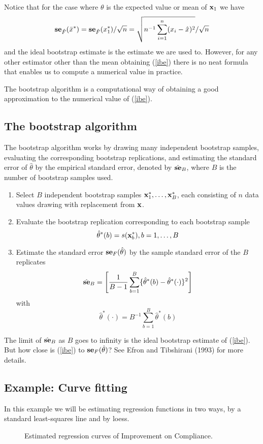 Notice that for the case where $\theta$ is the
expected value or mean of ${\mathbf x}_1$ we have
\[
{\bf se}_{\hat{F}}(\bar{x}^*) = {\bf se}_{\hat{F}}(x^*_1)/\sqrt{n} =
\sqrt{n^{-1} \sum_{i=1}^n (x_i - \hat{x})^2}/\sqrt{n}
\]
and the ideal bootstrap estimate is the estimate we are used
to. However, for any other estimator other than the mean obtaining
(\ref{ibe}) there is no neat formula that enables us to compute a
numerical value in practice.

The bootstrap algorithm is a computational way of obtaining a good
approximation to the numerical value of (\ref{ibe}).

\subsection{The bootstrap algorithm}
The bootstrap algorithm works by drawing many independent bootstrap
samples, evaluating the corresponding bootstrap replications, and
estimating the standard error of $\hat{\theta}$ by the empirical standard
error, denoted by $\hat{{\bf se}}_B$, where $B$ is the number of bootstrap
samples used.

\begin{enumerate}
\item Select $B$ independent bootstrap samples
  ${\mathbf x}_1^*,\dots,{\mathbf x}^*_B$, each consisting of $n$ data values drawing
  with replacement from ${\mathbf x}$. 
\item Evaluate the bootstrap replication corresponding to each
  bootstrap sample
\[
\hat{\theta}^*(b) = s({\mathbf x}_b^*), b=1,\dots,B
\]
\item Estimate the standard error ${\bf se}_{F}(\hat{\theta})$ by the
  sample standard error of the $B$ replicates
\[
\hat{{\bf se}}_B = \left[ \frac{1}{B-1}\sum_{b=1}^B \{ \hat{\theta}^*(b) -
  \hat{\theta}^*(\cdot) \}^2 \right]
\]
with
\[
\hat{\theta}^*(\cdot) = B^{-1} \sum_{b=1}^B  \hat{\theta}^*(b)
\]
\end{enumerate}
The limit of $\hat{{\bf se}}_B$ as $B$ goes to infinity is the ideal
bootstrap estimate of (\ref{ibe}). But how close is (\ref{ibe}) to
${\bf se}_F(\hat{\theta})$? See Efron and Tibshirani (1993) for more details.


\subsection{Example: Curve fitting}
In this example we will be estimating regression functions in two
ways, by a standard least-squares line and by loess. 
\begin{figure}
\begin{center}
\end{center}
\caption{\label{f5.3.1} Estimated regression curves of Improvement on
  Compliance.}
\end{figure}



